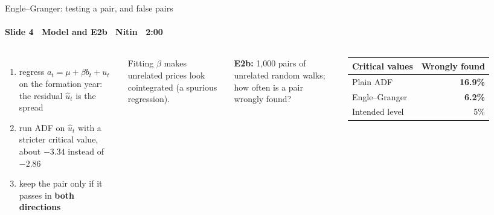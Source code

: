 \begin{frame}{Engle--Granger: testing a pair, and false pairs}
\framesubtitle{Slide 4 \textbullet\ Model and E2b \textbullet\ Nitin \textbullet\ 2:00}
\vspace{-2pt}
\begin{columns}[T,onlytextwidth]
  \small\raggedright
  \begin{enumerate}\setlength{\itemsep}{3pt}
    \item regress $a_t=\mu+\beta b_t+u_t$ on the formation year: the residual $\hat u_t$ is the spread
    \item run ADF on $\hat u_t$ with a stricter critical value, about $-3.34$ instead of $-2.86$
    \item keep the pair only if it passes in \textbf{both directions}
  \end{enumerate}
  Fitting $\beta$ makes unrelated prices look cointegrated (a spurious regression).
  \small\raggedright
  \textbf{E2b:} 1{,}000 pairs of unrelated random walks; how often is a pair wrongly found?\\[5pt]
  \footnotesize\setlength{\tabcolsep}{6pt}
  \begin{tabular}{@{}lr@{}}
    \toprule
    Critical values & Wrongly found \\
    \midrule
    Plain ADF & \textbf{16.9\%} \\
    Engle--Granger & \textbf{6.2\%} \\
    \midrule
    Intended level & 5\% \\
    \bottomrule
  \end{tabular}
\end{columns}
\end{frame}
